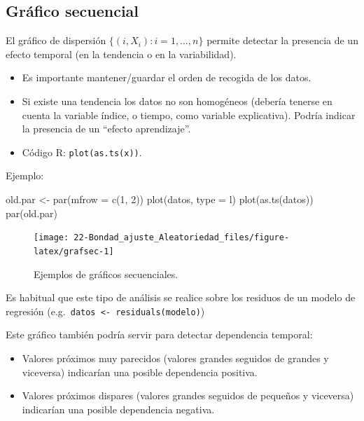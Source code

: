 \documentclass[
]{book}
\newenvironment{Shaded}{\begin{snugshade}}{\end{snugshade}}
\newcommand{\AttributeTok}[1]{\textcolor[rgb]{0.77,0.63,0.00}{#1}}
\newcommand{\DecValTok}[1]{\textcolor[rgb]{0.00,0.00,0.81}{#1}}
\newcommand{\FunctionTok}[1]{\textcolor[rgb]{0.00,0.00,0.00}{#1}}
\newcommand{\NormalTok}[1]{#1}
\newcommand{\OtherTok}[1]{\textcolor[rgb]{0.56,0.35,0.01}{#1}}
\newcommand{\StringTok}[1]{\textcolor[rgb]{0.31,0.60,0.02}{#1}}
\theoremstyle{break}
\theoremstyle{nonumberplain}
\begin{document}
\hypertarget{gruxe1fico-secuencial}{%
\subsection{Gráfico secuencial}\label{gruxe1fico-secuencial}}

El gráfico de dispersión \(\{(i,X_{i}) : i = 1, \ldots, n \}\) permite detectar la presencia de un efecto temporal (en la tendencia o en la variabilidad).

\begin{itemize}
\item
  Es importante mantener/guardar el orden de recogida de los datos.
\item
  Si existe una tendencia los datos no son homogéneos (debería tenerse
  en cuenta la variable índice, o tiempo, como variable explicativa).
  Podría indicar la presencia de un ``efecto aprendizaje''.
\item
  Código R: \texttt{plot(as.ts(x))}.
\end{itemize}

Ejemplo:

\begin{Shaded}
\begin{Highlighting}[]
\NormalTok{old.par }\OtherTok{\textless{}{-}} \FunctionTok{par}\NormalTok{(}\AttributeTok{mfrow =} \FunctionTok{c}\NormalTok{(}\DecValTok{1}\NormalTok{, }\DecValTok{2}\NormalTok{))}
\FunctionTok{plot}\NormalTok{(datos, }\AttributeTok{type =} \StringTok{\textquotesingle{}l\textquotesingle{}}\NormalTok{)}
\FunctionTok{plot}\NormalTok{(}\FunctionTok{as.ts}\NormalTok{(datos))}
\FunctionTok{par}\NormalTok{(old.par)}
\end{Highlighting}
\end{Shaded}

\begin{figure}[!htb]

{\centering \texttt{[image: 22-Bondad\_ajuste\_Aleatoriedad\_files/figure-latex/grafsec-1]} 

}

\caption{Ejemplos de gráficos secuenciales.}\label{fig:grafsec}
\end{figure}

Es habitual que este tipo de análisis se realice sobre los residuos
de un modelo de regresión (e.g.~\texttt{datos\ \textless{}-\ residuals(modelo)})

Este gráfico también podría servir para detectar dependencia temporal:

\begin{itemize}
\item
  Valores próximos muy parecidos (valores grandes seguidos de grandes
  y viceversa) indicarían una posible dependencia positiva.
\item
  Valores próximos dispares (valores grandes seguidos de pequeños
  y viceversa) indicarían una posible dependencia negativa.
\end{itemize}
\end{document}
